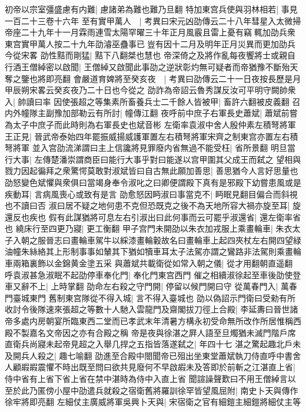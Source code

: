 初帝以宗室彊盛慮有内難|{
	慮諸弟為難也難乃旦翻}
特加東宫兵使與羽林相若|{
	事見一百二十三卷十六年}
至有實甲萬人　|{
	考異曰宋元凶劭傳云二十八年彗星入太微掃帝座二十九年十一月霖雨連雪太陽罕曜三十年正月風霰且雷上憂有竊輒加劭兵衆東宫實甲萬人按二十九年劭濬巫蠱事已豈有因十二月及明年正月災異而更加劭兵今從宋畧}
劭性黠而剛猛|{
	黠下八翻桀也慧也}
帝深倚之及將作亂每夜饗將士或親自行酒王僧綽密以啟聞|{
	王僧綽又啟聞此事劭之逆狀彰灼無可疑者而帝猶豫不斷殆天奪之鑒也將即亮翻}
會嚴道育婢將至癸亥夜　|{
	考異曰劭傳云二十一日夜按長歷是月甲辰朔宋畧云癸亥夜乃二十日也今從之}
劭詐為帝詔云魯秀謀反汝可平明守闕帥衆入|{
	帥讀曰率}
因使張超之等集素所畜養兵士二千餘人皆被甲|{
	畜許六翻被皮義翻}
召内外幢隊主副豫加部勒云有所討|{
	幢傳江翻}
夜呼前中庶子右軍長史蕭斌|{
	蕭斌前嘗為太子中庶子而此時則為右軍長史也斌音彬}
左衛率袁淑中舍人殷仲素左積弩將軍王正見|{
	晉武帝泰始四年罷振威揚威護軍置左右積弩將軍宋齊之制東宫亦置左右積弩將軍}
並入宫劭流涕謂曰主上信讒將見罪廢内省無過不能受枉|{
	省所景翻}
明旦當行大事|{
	左傳楚潘崇謂商臣曰能行大事乎對曰能遂以宫甲圍其父成王而弑之}
望相與戮力因起徧拜之衆驚愕莫敢對淑斌皆曰自古無此願加善思|{
	善思猶今人言好思量也}
劭怒變色斌懼與衆俱曰當竭身奉令淑叱之曰卿便謂殿下真有是邪殿下幼嘗患風或是疾動耳|{
	言病風喪心或致有是言}
劭愈怒因眄淑曰事當克不|{
	眄眠見翻目偏合而斜視也不讀曰否}
淑曰居不疑之地何患不克但恐既克之後不為天地所容大禍亦旋至耳|{
	旋還反也疾也}
假有此謀猶將可息左右引淑出曰此何事而云可罷乎淑還省|{
	還左衛率省也}
繞床行至四更乃寢|{
	更工衡翻}
甲子宫門未開劭以朱衣加戎服上乘畫輪車|{
	朱衣太子入朝之服晉志曰畫輪車駕牛以綵漆畫輪轂故名曰畫輪車上起四夾杖左右開四望緑油幢朱絲絡其上形制事事如輦其下猶如犢車耳太子法駕亦謂之鸞路非法駕則乘畫輪車兩箱裏飾以金錦黄金塗五采}
與蕭斌共載衛從如常入朝之儀|{
	從才用翻朝直遥翻}
呼袁淑甚急淑眠不起劭停車奉化門|{
	奉化門東宫西門}
催之相續淑徐起至車後劭使登車又辭不上|{
	上時掌翻}
劭命左右殺之守門開|{
	停留以候門開曰守}
從萬春門入|{
	萬春門臺城東門}
舊制東宫隊從不得入城|{
	言不得入臺城也}
劭以偽詔示門衛曰受勑有所收討令後隊速來張超之等數十人馳入雲龍門及齋閣拔刀徑上合殿|{
	李延夀曰晉世諸帝多處内房朝宴所臨東西二堂而已孝武末年清暑方構永初受命無所改作所居惟稱西殿不製嘉名文帝因之亦有合殿之稱}
帝是夜與徐湛之屛人語至旦燭猶未滅門階戶席直衛兵尚寢未起帝見超之入舉几捍之五指皆落遂弑之|{
	年四十七}
湛之驚起趣北戶未及開兵人殺之|{
	趣七喻翻}
劭進至合殿中閤聞帝已殂出坐東堂蕭斌執刀侍直呼中書舍人顧嘏嘏震懼不時出既至問曰欲共見廢何不早啟嘏未及答即於前斬之江湛直上省|{
	侍中省有上省下省上省在禁中湛時為侍中入直上省}
聞諠譟聲歎曰不用王僧綽言以至於此乃匿傍小屋中劭遣兵就殺之宿衛舊將羅訓徐罕皆望風屈附|{
	南史卜天與傳作徐牢將即亮翻}
左細仗主廣威將軍吳興卜天與|{
	宋宿衛之官有細鎧主細鎧將細仗主等}
